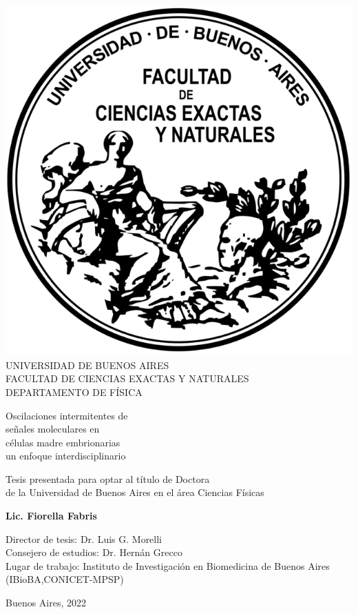 \documentclass[./main.tex]{subfiles}
\begin{document}
\thispagestyle{empty}
\begin{adjustwidth}{-0.5in}{-0.5in}

{
\begin{center}
\includegraphics[scale=1]{Logo-fcenuba.png}\\
{\Large UNIVERSIDAD DE BUENOS AIRES}\\
{FACULTAD DE CIENCIAS EXACTAS Y NATURALES}\\
DEPARTAMENTO DE FÍSICA \\
\vspace{1.2cm} 

{\Huge {} Oscilaciones intermitentes de\\señales moleculares en\\células madre embrionarias}{\huge {} \\un enfoque interdisciplinario\\}
\vspace{1cm}

{\large Tesis presentada para optar al título de Doctora\\de la Universidad de Buenos Aires en el área Ciencias Físicas}\\
\vspace{0.3cm}

{\Large\textbf{Lic. Fiorella Fabris}}

\end{center}
\vspace{1cm}

{\large \noindent Director de tesis: Dr. Luis G. Morelli} \\
\noindent Consejero de estudios: Dr. Hernán Grecco \\
\noindent Lugar de trabajo: Instituto de Investigación en Biomedicina de Buenos Aires (IBioBA,CONICET-MPSP) \\
\vspace{0.3cm}

\noindent Buenos Aires, 2022}
\end{adjustwidth}
\end{document}
